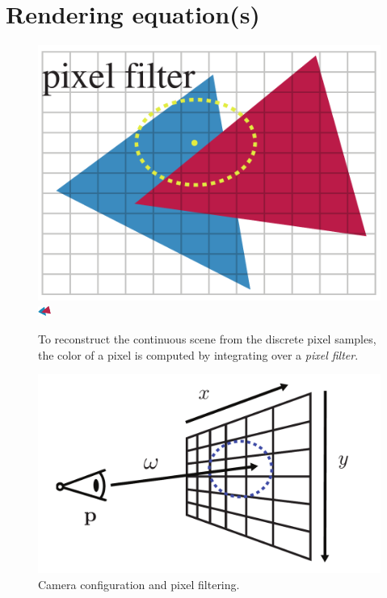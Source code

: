 \section{Rendering equation(s)}
\begin{figure}[h]
    \centering
    \includegraphics[width=0.4\linewidth]{imgs/pixel_filter.pdf}
    \includegraphics[width=0.4\linewidth]{imgs/antialiasing.pdf}
    \caption{To reconstruct the continuous scene from the discrete pixel samples, the color of a pixel is computed by integrating over a \emph{pixel filter}.}
    \label{fig:pixel_filter}
\end{figure}

\begin{figure}[h]
    \centering
    \includegraphics[width=0.4\linewidth]{imgs/camera.pdf}
    \caption{Camera configuration and pixel filtering.}
    \label{fig:camera}
\end{figure}

